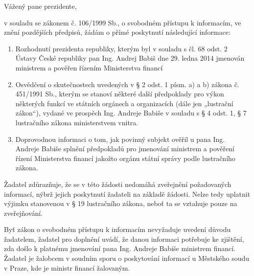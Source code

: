 \documentclass[11pt,a4paper,czech]{article}
\begin{document}


\def \yoursign { }
\def \yourdate { }
\def \oursign {JM 6/2014}
\def \place {Praha}

\printheader

\subject{Poskytnutí informací o jmenování ministra}

Vážený pane prezidente,

v souladu se zákonem č. 106/1999 Sb., o svobodném přístupu k informacím, ve znění pozdějších předpisů, žádám o přímé poskytnutí následující informace:

\begin{enumerate}
\item Rozhodnutí prezidenta republiky, kterým byl v souladu s čl. 68 odst. 2 Ústavy České republiky pan Ing. Andrej Babiš dne 29. ledna 2014 jmenován ministrem a pověřen řízením Ministerstva financí
\item Osvědčení o skutečnostech uvedených v § 2 odst. 1 písm. a) a b) zákona č. 451/1991 Sb., kterým se stanoví některé další předpoklady pro výkon některých funkcí ve státních orgánech a organizacích (dále jen „lustrační zákon“), vydané ve prospěch Ing. Andreje Babiše v souladu s § 4 odst. 1, § 7 lustračního zákona ministerstvem vnitra.
\item Doprovodnou informaci o tom, jak povinný subjekt ověřil u pana Ing. Andreje Babiše splnění předpokladů pro jmenování ministrem a pověření řízení Ministerstva financí jakožto orgánu státní správy podle lustračního zákona.
\end{enumerate}
Žadatel zdůrazňuje, že se v této žádosti nedomáhá zveřejnění požadovaných informací, nýbrž jejich poskytnutí žadateli na základě žádosti. Nelze tedy uplatnit výjimku stanovenou v § 19 lustračního zákona, neboť ta se vztahuje pouze na zveřejňování. 

Byť zákon o svobodném přístupu k informacím nevyžaduje uvedení důvodu žadatelem, žadatel pro doplnění uvádí, že danou informaci potřebuje ke zjištění, zda došlo k platnému jmenování pana Ing. Andreje Babiše ministrem financí. Žadatel je žalobcem v soudním sporu o poskytování informací u Městského soudu v Praze, kde je ministr financí žalovaným.

\signature{S úctou 

\bigskip
Mgr. Bc. Jakub Michálek}

\end{document}

